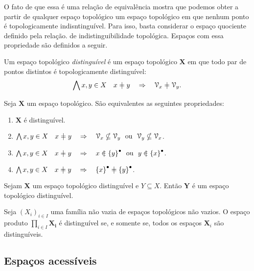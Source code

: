 O fato de que essa é uma relação de equivalência mostra que podemos obter a partir de qualquer espaço topológico um espaço topológico em que nenhum ponto é topologicamente indisntinguível. Para isso, basta considerar o espaço quociente definido pela relação. de indistinguibilidade topológica. Espaços com essa propriedade são definidos a seguir.

\begin{definition}[$T_0$]
Um espaço topológico \emph{distinguível} é um espaço topológico $\bm X$ em que todo par de pontos distintos é topologicamente distinguível:
	\begin{equation*}
	\forall x,y \in X \quad x \neq y \quad \Rightarrow \quad \viz_x \neq \viz_y.
	\end{equation*}
\end{definition}

\begin{proposition}
Seja $\bm X$ um espaço topológico. São equivalentes as seguintes propriedades:
	\begin{enumerate}
	\item $\bm X$ é distinguível.
	\item $\forall x,y \in X \quad x \neq y \quad \Rightarrow \quad \viz_x \nsubseteq \viz_y \text{\ \ ou\ \ } \viz_y \nsubseteq \viz_x$.
	\item $\forall x,y \in X \quad x \neq y \quad \Rightarrow \quad x \notin \Fec{\{y\}} \text{\ \ ou\ \ } y \notin \Fec{\{x\}}$.
	\item $\forall x,y \in X \quad x \neq y \quad \Rightarrow \quad \Fec{\{x\}} \neq \Fec{\{y\}}$.	
\end{enumerate}
\end{proposition}

\begin{proposition}
Sejam $\bm X$ um espaço topológico distinguível e $Y \subseteq X$. Então $\bm Y$ é um espaço topológico distinguível.
\end{proposition}

\begin{proposition}
Seja $(X_i)_{i \in I}$ uma família não vazia de espaços topológicos não vazios. O espaço produto $\prod_{i \in I} \bm{X_i}$ é distinguível se, e somente se, todos os espaços $\bm X_i$ são distinguíveis.
\end{proposition}

\subsection{Espaços acessíveis}


